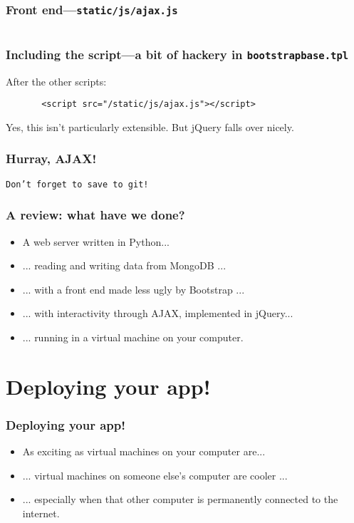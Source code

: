 \documentclass{beamer}
\begin{document}
\begin{frame}
  \frametitle{Front end---\texttt{static/js/ajax.js}}
  \inputminted{js}{../steps/03-frontend/04-demo-app/static/js/ajax.js}
\end{frame}

\begin{frame}[fragile]
  \frametitle{Including the script---a bit of hackery in
    \texttt{bootstrapbase.tpl}}
  
  After the other scripts:
  \begin{verbatim}
       <script src="/static/js/ajax.js"></script>
  \end{verbatim}

  Yes, this isn't particularly extensible. But jQuery falls over
  nicely.
\end{frame}

\begin{frame}
  \frametitle{Hurray, AJAX!}

  \texttt{Don't forget to save to git!}
\end{frame}

\begin{frame}
  \frametitle{A review: what have we done?}
  \begin{itemize}
  \item A web server written in Python...
  \item ... reading and writing data from MongoDB ...
  \item ... with a front end made less ugly by Bootstrap ...
  \item ... with interactivity through AJAX, implemented in jQuery...
  \item ... running in a virtual machine on your computer.
  \end{itemize}
\end{frame}

\section{Deploying your app!}

\begin{frame}
  \frametitle{Deploying your app!}
  \begin{itemize}
  \item As exciting as virtual machines on your computer are...
  \item ... virtual machines on someone else's computer are cooler ...
  \item ... especially when that other computer is permanently
    connected to the internet.
  \end{itemize}
\end{frame}
\end{document}
